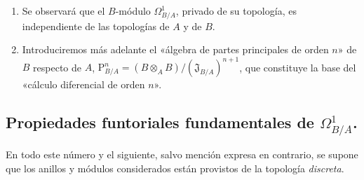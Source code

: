 \begin{remarks}[20.4.14]
\label{0.20.4.14-fr}
\begin{enumerate}
  \item[\rm(i)] Se observará que el $B$-módulo $\Omega^1_{B/A}$, privado de su
  topología, es independiente de las topologías de $A$ y de $B$.
  \item[\rm(ii)] Introduciremos más adelante el «álgebra de partes
  principales de orden $n$» de $B$ respecto de $A$,
  $\mathrm{P}^n_{B/A}=(B\otimes_A B)/(\mathfrak{J}_{B/A})^{n+1}$, que constituye
  la base del «cálculo diferencial de orden $n$».
\end{enumerate}
\end{remarks}


\subsection{Propiedades funtoriales fundamentales de
\texorpdfstring{$\Omega^1_{B/A}$}{Omega1(B/A)}.}
\label{subsection:0.20.5-fr}


\begin{env}[20.5.1]
\label{0.20.5.1-fr}
En todo este número y el siguiente, salvo mención expresa en contrario, se
supone que los anillos y módulos considerados están provistos de la topología
\emph{discreta}.
\end{env}


